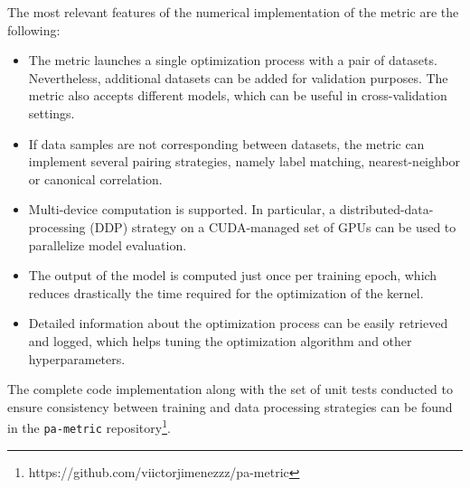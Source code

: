 \begin{properties}
    The most relevant features of the numerical implementation of the metric are the following:
\begin{itemize}
    \item The metric launches a single optimization process with a pair of datasets. Nevertheless, 
    additional datasets can be added for validation purposes. The metric also accepts different models,
    which can be useful in cross-validation settings.
    \item If data samples are not corresponding between datasets, the metric can implement several
    pairing strategies, namely label matching, nearest-neighbor or canonical correlation.
    \item Multi-device computation is supported. In particular, a distributed-data-processing (DDP)
    strategy on a CUDA-managed set of GPUs can be used to parallelize model evaluation.
    \item The output of the model is computed just once per training epoch, which reduces drastically
    the time required for the optimization of the kernel.
    \item Detailed information about the optimization process can be easily retrieved and logged, which helps
    tuning the optimization algorithm and other hyperparameters.
\end{itemize}
\end{properties}

The complete code implementation along with the set of unit tests conducted 
to ensure consistency between training and data processing strategies can be 
found in the \texttt{pa-metric} repository\footnote{https://github.com/viictorjimenezzz/pa-metric}.


